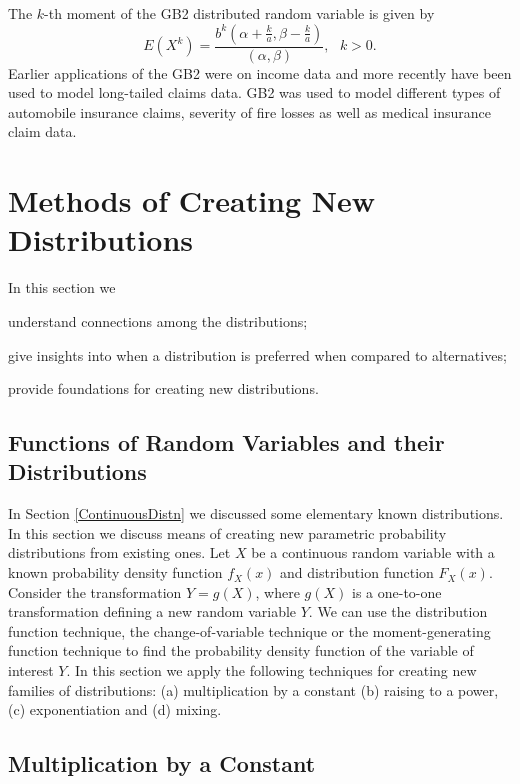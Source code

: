 \documentclass[]{book}
\begin{document}
The \(k\)-th moment of the GB2 distributed random variable is given by
\[E\left( X^{k} \right) = \frac{b^{k}\left( \alpha + \frac{k}{a},\beta - \frac{k}{a} \right)}{\left( \alpha,\beta \right)}, \ \ \ k > 0.\]
Earlier applications of the GB2 were on income data and more recently
have been used to model long-tailed claims data. GB2 was used to model
different types of automobile insurance claims, severity of fire losses
as well as medical insurance claim data.

\section{Methods of Creating New Distributions}\label{MethodsCreation}

In this section we

understand connections among the distributions;

give insights into when a distribution is preferred when compared to
alternatives;

provide foundations for creating new distributions.

\subsection{Functions of Random Variables and their
Distributions}\label{functions-of-random-variables-and-their-distributions}

In Section \ref{ContinuousDistn} we discussed some elementary known
distributions. In this section we discuss means of creating new
parametric probability distributions from existing ones. Let \(X\) be a
continuous random variable with a known probability density function
\(f_{X}(x)\) and distribution function \(F_{X}(x)\). Consider the
transformation \(Y = g\left( X \right)\), where \(g(X)\) is a one-to-one
transformation defining a new random variable \(Y\). We can use the
distribution function technique, the change-of-variable technique or the
moment-generating function technique to find the probability density
function of the variable of interest \(Y\). In this section we apply the
following techniques for creating new families of distributions: (a)
multiplication by a constant (b) raising to a power, (c) exponentiation
and (d) mixing.

\subsection{Multiplication by a
Constant}\label{multiplication-by-a-constant}
\end{document}
